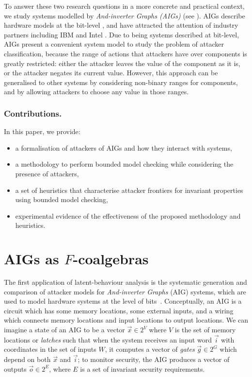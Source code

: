 {\color{red}
To answer these two research questions in a more concrete and practical context, we study systems modelled by \emph{And-inverter Graphs (AIGs)} (see  \cite{AIGs,AIGs2}). AIGs describe hardware models at the bit-level \cite{AIGER}, and have attracted the attention of industry partners including IBM and Intel \cite{HWMCC2014BM}. Due to being systems described at bit-level, AIGs present a convenient system model to study the problem of attacker classification, because the range of actions that attackers have over components is greatly restricted: either the attacker leaves the value of the component as it is, or the attacker negates its current value. However, this approach can be generalised to other systems by considering non-binary ranges for components, and by allowing attackers to choose any value in those ranges.

\subsubsection{Contributions.} In this paper, we provide:
\begin{itemize}
\item a formalisation of attackers of AIGs and how they interact with systems, 
\item a methodology to perform bounded model checking while considering the presence of attackers,
\item a set of heuristics that characterise attacker frontiers for invariant properties using bounded model checking,
\item experimental evidence of the effectiveness of the proposed methodology and heuristics.
\end{itemize}

\section{AIGs as $F$-coalgebras}
\label{sec:Classification:LatentBehaviours}
The first application of latent-behaviour analysis is the systematic generation and comparison of attacker models for \emph{And-inverter Graphs} (AIG) systems, which are used to model hardware systems at the level of bits~\cite{??}. 
Conceptually, an AIG is a circuit which has some memory locations, some external inputs, and a wiring which connects memory locations and input locations to output locations. We can imagine a state of an AIG to be a vector $\vec{x}\in 2^V$ where $V$ is the set of memory locations or \emph{latches} such that when the system receives an input word $\vec{i}$ with coordinates in the set of inputs $W$, it computes a vector of \emph{gates} $\vec{g}\in 2^G$ which depend on both $\vec{x}$ and $\vec{i}$; to monitor security, the AIG produces a vector of outputs $\vec{o}\in 2^E$, where $E$ is a set of invariant security requirements.

}
